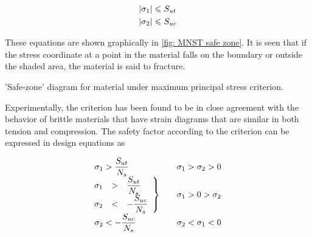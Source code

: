 \documentclass[
fontsize=10pt,
a4paper,
twosides=false,
open=any,
svgnames,
]{kaobook} %
\begin{document}
\[\begin{gathered}
    \left| \sigma _1 \right| \leqslant S_{ut} \hfill \\
    \left| \sigma _2 \right| \leqslant S_{uc} \hfill \\ 
  \end{gathered} \]

These equations are shown graphically in \cref{fig: MNST safe zone}. It is seen that if the stress coordinate at a point in the material falls on the boundary or outside the shaded area, the material is said to fracture.

\begin{marginfigure}
  \centering
  \caption{'Safe-zone' diagram for material under maximum principal stress criterion.}
  \label{fig: MNST safe zone}
\end{marginfigure}

Experimentally, the criterion has been found to be in close agreement with the behavior of brittle materials that have strain diagrams that are similar in both tension and compression. The safety factor according to the criterion can be expressed in design equations as

\begin{equation}
  \begin{array}{l l l}
  \sigma_1 > \dfrac{S_{ut}}{N_s} & & \sigma_1 > \sigma_2 > 0 \\
  \left. \hspace{-0.23cm}
  \begin{array}{l l l}
    \sigma_1 & > & \dfrac{S_{ut}}{N_s} \\
    \sigma_2 & < & -\dfrac{S_{uc}}{N_s}
    \end{array} \right\} & & \sigma_1 > 0 > \sigma_2 \\
    \sigma_2 <  - \dfrac{S_{uc}}{N_s} & & \sigma _2 < \sigma _1 < 0
  \end{array}
\end{equation}
\end{document}
